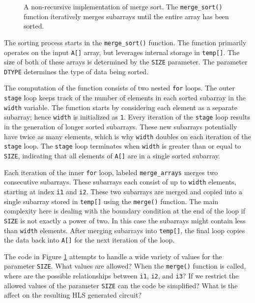 \begin{figure}

\caption{  A non-recursive implementation of merge sort. The \lstinline{merge_sort()} function iteratively merges subarrays until the entire array has been sorted. }
\label{fig:merge_sort.cpp}
\end{figure}

The sorting process starts in the \lstinline{merge_sort()} function. The function primarily operates on the input \lstinline{A[]} array, but leverages internal storage in \lstinline{temp[]}. The size of both of these arrays is determined by the \lstinline{SIZE} parameter. The parameter \lstinline{DTYPE} determines the type of data being sorted.

The computation of the function consists of two nested \lstinline{for} loops. The outer \lstinline{stage} loop keeps track of the number of elements in each sorted subarray in the \lstinline{width} variable. The function starts by considering each element as a separate subarray; hence \lstinline{width} is initialized as \lstinline{1}. Every iteration of the \lstinline{stage} loop results in the generation of longer sorted subarrays. These new subarrays potentially have twice as many elements, which is why \lstinline{width} doubles on each iteration of the \lstinline{stage} loop. The \lstinline{stage} loop terminates when \lstinline{width} is greater than or equal to \lstinline{SIZE}, indicating that all elements of \lstinline{A[]} are in a single sorted subarray.

Each iteration of the inner \lstinline{for} loop, labeled \lstinline{merge_arrays} merges two consecutive subarrays. These subarrays each consist of up to \lstinline{width} elements, starting at index \lstinline{i1} and \lstinline{i2}.  These two subarrays are merged and copied into a single subarray stored in \lstinline{temp[]} using the \lstinline{merge()} function.  The main complexity here is dealing with the boundary condition at the end of the loop if \lstinline{SIZE} is not exactly a power of two.  In this case the subarrays might contain less than \lstinline{width} elements. After merging subarrays into \lstinline{temp[]}, the final loop copies the data back into \lstinline{A[]} for the next iteration of the loop.

\begin{exercise}
The code in Figure \ref{fig:merge_sort.cpp} attempts to handle a wide variety of values for the parameter \lstinline{SIZE}.  What values are allowed?  When the \lstinline{merge()} function is called, where are the possible relationships between \lstinline{i1}, \lstinline{i2}, and \lstinline{i3}?   If we restrict the allowed values of the parameter \lstinline{SIZE} can the code be simplified?  What is the affect on the resulting HLS generated circuit? 
\end{exercise}

